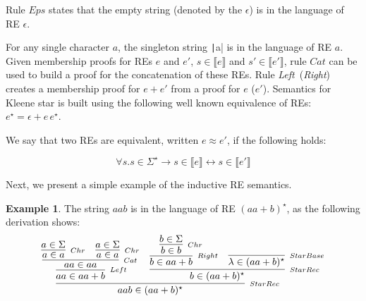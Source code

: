 \documentclass[oneside,12pt]{scrbook}
\theoremstyle{definition}
\newtheorem{Example}{Example}
\newcommand{\Eps}{\textit{Eps}}
\newcommand{\Catt}{\textit{Cat}}
\newcommand{\Left}{\textit{Left}}
\newcommand{\Right}{\textit{Right}}
\newcommand{\sembrackets}[1]{\ensuremath{\llbracket #1 \rrbracket}}
\newcommand{\coq}[1]{\texttt|#1|}
\theoremstyle{plain}
\theoremstyle{definition}
\begin{document}
Rule $\Eps$ states that the empty string (denoted by the $\epsilon$)
is in the language of RE $\epsilon$.

For any single character $a$, the singleton string \coq{a} is in the language 
of RE $a$. Given membership proofs for REs $e$ and $e'$, $s \in \sembrackets{e}$ 
and $s' \in\sembrackets{e'}$, rule $\Catt$ can be used to build a proof
for the concatenation of these REs.  Rule \Left~(\Right) creates a membership proof
for $e + e'$ from a proof for $e$ ($e'$). Semantics for Kleene star
is built using the following well known equivalence of REs: $e^\star
= \epsilon + e\,e^\star$. 

We say that two REs are equivalent, written $e\approx e'$, if the following holds:

\[
\forall s. s\in \Sigma^\star \to s \in\sembrackets{e} \leftrightarrow s\in\sembrackets{e'} 
\]

Next, we present a simple example of the inductive RE semantics.

\begin{Example}
    The string $aab$ is in the language of RE $(aa + b)^\star$, as the following derivation shows:
    \begin{equation*}
        \infer[_{StarRec}]{aab \in (aa + b)^\star}
              {
                  \infer[_{Left}]{aa \in aa + b}
                        {
                            \infer[_{Cat}]{aa \in aa}
                                  {
                                      \infer[_{Chr}]{a \in a}{a \in \Sigma} &
                                      \infer[_{Chr}]{a \in a}{a \in \Sigma}
                                  }
                        }
                  &
                  \infer[_{StarRec}]{b \in (aa + b)^\star}
                        {
                            \infer[_{Right}]{b \in aa + b}
                                  {
                                      \infer[_{Chr}]{b \in b}{b \in \Sigma}
                                  }
                            &
                            \infer[_{StarBase}]{\lambda \in (aa + b)^\star}{}
                        }
              }
    \end{equation*}
\end{Example}
\end{document}
